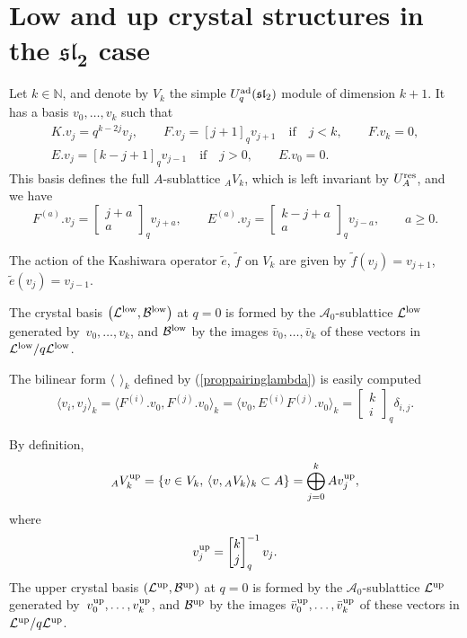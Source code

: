 \documentclass[10pt,a4paper]{amsart}
\numberwithin{equation}{section}
\theoremstyle{definition}
\newcommand{\Aa}{{\mathcal A}}
\begin{document}
\appendix
\section[Low and up crystal structures in the sl\_2 case]{Low and up crystal structures in the $\boldsymbol{{\mathfrak{sl}_2}}$ case}\label{lowupbases}
Let $k\in {\mathbb N}$, and denote by $V_k$ the simple $U_q^{\rm ad}({\mathfrak{sl}_2})$ module of dimension $k+1$. It has a basis $v_0,\dots, v_k$ such that
\begin{gather*}%
K.v_j=q^{k-2j}v_j,\qquad
F.v_j=[j+1]_qv_{j+1}\quad \mathrm{if}\quad j<k,\qquad F.v_k=0,\\
 E.v_j=[k-j+1]_q v_{j-1}\quad \mathrm{if}\quad j>0,\qquad E.v_0=0.
\end{gather*}
This basis defines the full $A$-sublattice
${}_AV_k$, which is left invariant by $U_A^{\rm res}$, and we have
\[ F^{(a)}.v_j=\left[\begin{matrix} j+a \\ a \end{matrix}\right]_{q} v_{j+a},\qquad E^{(a)}.v_j=\left[\begin{matrix} k-j+a \\ a \end{matrix}\right]_{q} v_{j-a}, \qquad a\geq 0.
\]

The action of the Kashiwara operator $\tilde{e}$, $\tilde{f}$ on $V_k$ are given by $\tilde{f}(v_j)=v_{j+1}$, $\tilde{e}(v_j)=v_{j-1}$.

The crystal basis $\big({\mathcal L}^{\rm low}, {\mathcal B}^{\rm low}\big)$ at $q=0$ is formed by the $\Aa_0$-sublattice ${\mathcal L}^{\rm low}$ generated by~${v_0,\dots ,v_k}$, and ${\mathcal B}^{\rm low}$ by the images $\bar{v}_0,\dots ,\bar{v}_k $ of these vectors in ${\mathcal L}^{\rm low}/q {\mathcal L}^{\rm low}$.

The bilinear form $\langle\,\ \rangle_k$ defined by (\ref{proppairinglambda}) is easily computed
\[
\langle v_i, v_j\rangle_k =\big\langle F^{(i)}.v_0, F^{(j)}.v_0\big\rangle_k= \big\langle v_0, E^{(i)}F^{(j)}.v_0\big\rangle_k=
\left[\begin{matrix} k\\ i \end{matrix}\right]_{q}\delta_{i,j}.
\]

By definition,
\[
{}_AV_k^{\rm up}=\{v \in V_k,\, \langle v, {}_AV_k\rangle_k\subset A\}=\bigoplus_{j=0}^k A v_j^{\rm up},
\]
where
\[v_j^{\rm up}=\left[\begin{matrix} k\\ j \end{matrix}\right]_{q}^{-1} v_j.\]
The upper crystal basis $({\mathcal L}^{\rm up}, {\mathcal B}^{\rm up})$ at $q=0$ is formed by the $\Aa_0$-sublattice ${\mathcal L}^{\rm up}$ generated by~${v_0^{\rm up},\dots ,v_k^{\rm up}}$, and ${\mathcal B}^{\rm up}$ by the images $\bar{v}_0^{\rm up},\dots ,\bar{v}_k^{\rm up} $ of these vectors in ${\mathcal L}^{\rm up}/q {\mathcal L}^{\rm up}$.
\end{document}
